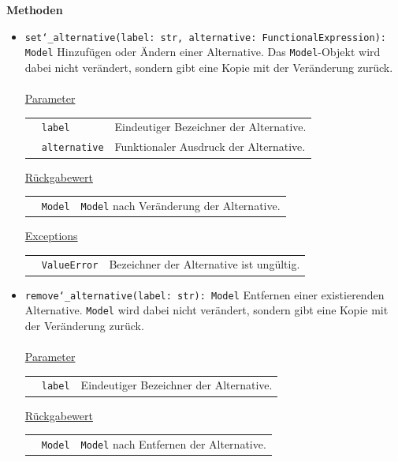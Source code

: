 \documentclass{article}
\begin{document}
\textbf{{Methoden}}
\begin{itemize}
\item \texttt{set\char`_alternative(label: str, alternative: FunctionalExpression): Model} \newline Hinzufügen oder Ändern einer Alternative. Das \texttt{Model}-Objekt wird dabei nicht verändert, sondern gibt eine Kopie mit der Veränderung zurück.
\\\\
\underline{{Parameter}}

\begin{tabular}{lll}
 & \texttt{label} & Eindeutiger Bezeichner der Alternative. \\
 & \texttt{alternative} & Funktionaler Ausdruck der Alternative. \\
\end{tabular}

\underline{{Rückgabewert}}

\begin{tabular}{lll}
 & \texttt{Model} & \texttt{Model} nach Veränderung der Alternative. \\
\end{tabular}

\underline{Exceptions}\\
\begin{tabular}{lll}
 & \texttt{ValueError} & Bezeichner der Alternative ist ungültig.\\
\end{tabular}


\item \texttt{remove\char`_alternative(label: str): Model} \newline Entfernen einer existierenden Alternative. \texttt{Model} wird dabei nicht verändert, sondern gibt eine Kopie mit der Veränderung zurück.
\\\\
\underline{{Parameter}}

\begin{tabular}{lll}
 & \texttt{label} & Eindeutiger Bezeichner der Alternative. \\
\end{tabular}

\underline{{Rückgabewert}}

\begin{tabular}{lll}
 & \texttt{Model} & \texttt{Model} nach Entfernen der Alternative. \\
\end{tabular}


\end{itemize}
\end{document}
